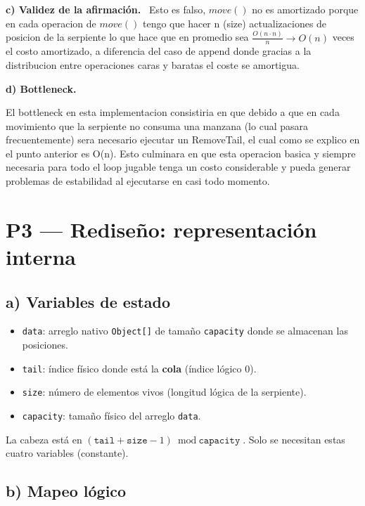 \documentclass[11pt,a4paper]{article}
\newcommand{\sub}[2]{\medskip\par\noindent\textbf{#1) #2.}\ }
\begin{document}
\sub{c}{Validez de la afirmación} %
Esto es falso, $move()$ no es amortizado porque en cada operacion de $move()$ tengo que hacer n (size) actualizaciones de posicion de la serpiente lo que hace que en promedio sea $\frac{O(n \cdot n)}{n} \rightarrow O(n)$ veces el costo amortizado, a diferencia del caso de append donde gracias a la distribucion entre operaciones caras y baratas el coste se amortigua.


\sub{d}{Bottleneck} %

El bottleneck en esta implementacion consistiria en que debido a que en cada movimiento que la serpiente no consuma una manzana (lo cual pasara frecuentemente) sera necesario ejecutar un RemoveTail, el cual como se explico en el punto anterior es O(n).
Esto culminara en que esta operacion basica y siempre necesaria para todo el loop jugable tenga un costo considerable y pueda generar problemas de estabilidad al ejecutarse en casi todo momento.

\section*{P3 --- Rediseño: representación interna}

\subsection*{a) Variables de estado}

\begin{itemize}[leftmargin=1.2cm]
    \item \texttt{data}: arreglo nativo \texttt{Object[]} de tamaño \texttt{capacity} donde se almacenan las posiciones.
    \item \texttt{tail}: índice físico donde está la \textbf{cola} (índice lógico $0$).
    \item \texttt{size}: número de elementos vivos (longitud lógica de la serpiente).
    \item \texttt{capacity}: tamaño físico del arreglo \texttt{data}.
\end{itemize}

La cabeza está en $(\texttt{tail} + \texttt{size} - 1) \bmod \texttt{capacity}$. Solo se necesitan estas cuatro variables (constante).

\subsection*{b) Mapeo lógico}
\end{document}
